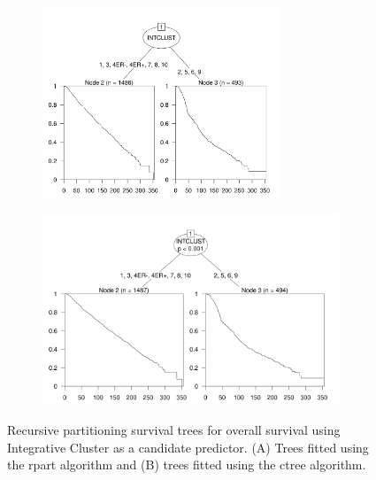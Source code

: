 \begin{figure}[!htbp]
\centering

\begin{minipage}{.44\textwidth}
\begin{subfigure}{\textwidth}
\subcaption{}
\includegraphics[width=\linewidth, height = 5.7cm]{../figures/Appendices/Appendix_B/Ind_Partykit_Survival_Score_OS_INTCLUST.png}
\end{subfigure}\par
\end{minipage}
\begin{minipage}{.55\textwidth}
\begin{subfigure}{\textwidth}
\subcaption{}
\includegraphics[width=\linewidth, height = 5.7cm]{../figures/Appendices/Appendix_B/Ind_Ctree_Survival_Score_OS_INTCLUST.png}
\end{subfigure}\par
\end{minipage}

\caption[Recursive partitioning survival trees for overall survival using Integrative Cluster as a candidate predictor.]{Recursive partitioning survival trees for overall survival using Integrative Cluster as a candidate predictor. (A) Trees fitted using the rpart algorithm and (B) trees fitted using the ctree algorithm.}
\end{figure}


